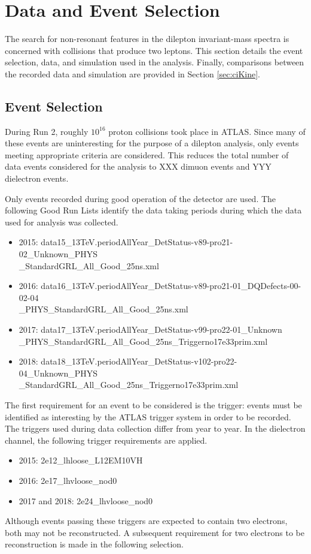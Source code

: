 \section{Data and Event Selection}\label{sec:ciEvSel}

The search for non-resonant features in the dilepton invariant-mass spectra is concerned with collisions that produce two leptons.
This section details the event selection, data, and simulation used in the analysis.
Finally, comparisons between the recorded data and simulation are provided in Section \ref{sec:ciKine}.


\subsection{Event Selection}
During Run 2, roughly $10^{16}$ proton collisions took place in ATLAS. \check
Since many of these events are uninteresting for the purpose of a dilepton analysis, only events meeting appropriate criteria are considered.
This reduces the total number of data events considered for the analysis to {\color{red}XXX} dimuon events and {\color{red}YYY} dielectron events.

Only events recorded during good operation of the detector are used.
The following Good Run Lists identify the data taking periods during which the data used for analysis was collected.
\begin{itemize}
	\item 2015: data15\_13TeV.periodAllYear\_DetStatus-v89-pro21-02\_Unknown\_PHYS \\ \_StandardGRL\_All\_Good\_25ns.xml
	\item 2016: data16\_13TeV.periodAllYear\_DetStatus-v89-pro21-01\_DQDefects-00-02-04 \\ \_PHYS\_StandardGRL\_All\_Good\_25ns.xml
	\item 2017: data17\_13TeV.periodAllYear\_DetStatus-v99-pro22-01\_Unknown \\ \_PHYS\_StandardGRL\_All\_Good\_25ns\_Triggerno17e33prim.xml
	\item 2018: data18\_13TeV.periodAllYear\_DetStatus-v102-pro22-04\_Unknown\_PHYS \\ \_StandardGRL\_All\_Good\_25ns\_Triggerno17e33prim.xml
\end{itemize}

The first requirement for an event to be considered is the trigger: events must be identified as interesting by the ATLAS trigger system in order to be recorded.
The triggers used during data collection differ from year to year. 
In the dielectron channel, the following trigger requirements are applied.
\begin{itemize}
	\item 2015: 2e12\_lhloose\_L12EM10VH
	\item 2016: 2e17\_lhvloose\_nod0
	\item 2017 and 2018: 2e24\_lhvloose\_nod0
\end{itemize}
Although events passing these triggers are expected to contain two electrons, both may not be reconstructed. 
A subsequent requirement for two electrons to be reconstruction is made in the following selection.

